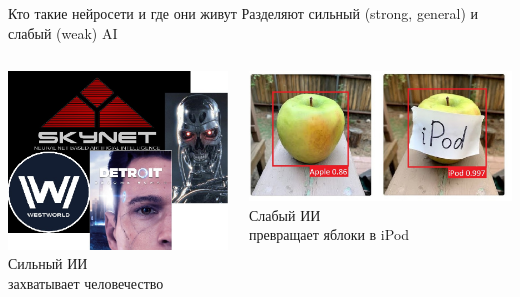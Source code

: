 \documentclass[aspectratio=169, professionalfonts]{beamer}
\begin{document}
\begin{frame}{Кто такие нейросети и где они живут}
    Разделяют сильный (strong, general) и слабый (weak) AI
    \pause
    \begin{columns}
        \begin{column}{.35\linewidth}
            \centering
            \includegraphics[width=\linewidth]{graphs/fig4_1.jpg}
            Сильный ИИ \\
            \footnotesize{захватывает человечество}
        \end{column}
        \pause
        \begin{column}{.35\linewidth}
            \centering
            \includegraphics[width=\linewidth]{graphs/fig4_2.jpg}
            Слабый ИИ \\
            \footnotesize{превращает яблоки в iPod}
        \end{column}
    \end{columns}
\end{frame}
\end{document}
